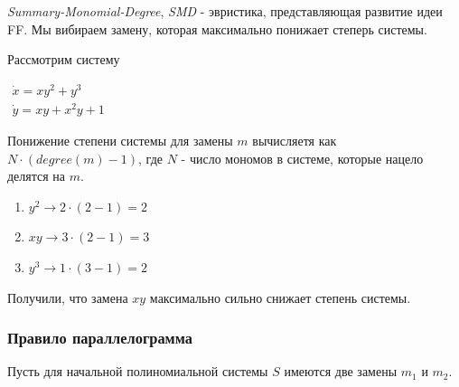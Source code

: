 \begin{heuristics} \label{AEQD}
    \textit{Summary-Monomial-Degree}, \textit{SMD} - эвристика, представляющая развитие идеи FF. Мы вибираем замену, которая максимально понижает степерь системы.
    
    \begin{example}
        Рассмотрим систему
        
        $\begin{array}{lcl}
             \dot x = xy^2 + y^3 \\
             \dot y = xy + x^2 y + 1
        \end{array}$
        \newline
        
        Понижение степени системы для замены $m$ вычисляетя как $N \cdot (degree(m) - 1)$, где $N$ - число мономов в системе, которые нацело делятся на $m$.
        \begin{enumerate}
            \item $y^2 \longrightarrow 2 \cdot (2 - 1) = 2$
            \item $xy \longrightarrow 3 \cdot (2 - 1) = 3$
            \item $y^3 \longrightarrow 1 \cdot (3 - 1) = 2$
        \end{enumerate}
        Получили, что замена $xy$ максимально сильно снижает степень системы.
    \end{example}
\end{heuristics}

\subsubsection{Правило параллелограмма}

Пусть для начальной полиномиальной системы $S$ имеются две замены $m_1$ и $m_2$.

